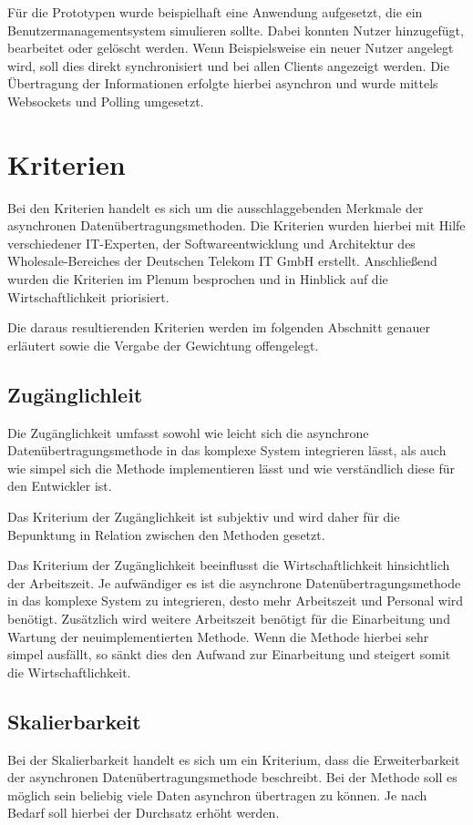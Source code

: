 Für die Prototypen wurde beispielhaft eine Anwendung aufgesetzt, die ein Benutzermanagementsystem simulieren sollte. Dabei konnten Nutzer hinzugefügt, bearbeitet oder gelöscht werden. Wenn Beispielsweise ein neuer Nutzer angelegt wird, soll dies direkt synchronisiert und bei allen Clients angezeigt werden. Die Übertragung der Informationen erfolgte hierbei asynchron und wurde mittels Websockets und Polling umgesetzt.

\section{Kriterien}
Bei den Kriterien handelt es sich um die ausschlaggebenden Merkmale der asynchronen Datenübertragungsmethoden. Die Kriterien wurden hierbei mit Hilfe verschiedener IT-Experten, der Softwareentwicklung und Architektur des Wholesale-Bereiches der Deutschen Telekom IT GmbH erstellt. Anschließend wurden die Kriterien im Plenum besprochen und in Hinblick auf die Wirtschaftlichkeit priorisiert. 

Die daraus resultierenden Kriterien werden im folgenden Abschnitt genauer erläutert sowie die Vergabe der Gewichtung offengelegt. 

\subsection{Zugänglichleit}
Die Zugänglichkeit umfasst sowohl wie leicht sich die asynchrone Datenübertragungsmethode in das komplexe System integrieren lässt, als auch wie simpel sich die Methode implementieren lässt und wie verständlich diese für den Entwickler ist.

Das Kriterium der Zugänglichkeit ist subjektiv und wird daher für die Bepunktung in Relation zwischen den Methoden gesetzt.

Das Kriterium der Zugänglichkeit beeinflusst die Wirtschaftlichkeit hinsichtlich der Arbeitszeit. Je aufwändiger es ist die asynchrone Datenübertragungsmethode in das komplexe System zu integrieren, desto mehr Arbeitszeit und Personal wird benötigt. Zusätzlich wird weitere Arbeitszeit benötigt für die Einarbeitung und Wartung der neuimplementierten Methode. Wenn die Methode hierbei sehr simpel ausfällt, so sänkt dies den Aufwand zur Einarbeitung und steigert somit die Wirtschaftlichkeit. 

\subsection{Skalierbarkeit}
Bei der Skalierbarkeit handelt es sich um ein Kriterium, dass die Erweiterbarkeit der asynchronen Datenübertragungsmethode beschreibt. Bei der Methode soll es möglich sein beliebig viele Daten asynchron übertragen zu können. Je nach Bedarf soll hierbei der Durchsatz erhöht werden. 

